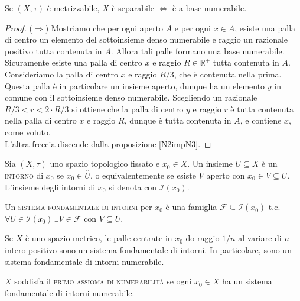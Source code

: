 \documentclass{article}
\begin{document}
\begin{prop} \label{metr-num}
	Se $(X, \tau)$ è metrizzabile, $X$ è separabile $\Leftrightarrow$ è a base numerabile.
\end{prop}

\begin{proof}
	($\Rightarrow$) Mostriamo che per ogni aperto $A$ e per ogni $x \in A$, esiste una palla di centro un elemento del sottoinsieme denso numerabile e raggio un razionale positivo tutta contenuta in $A$. Allora tali palle formano una base numerabile. \\
	Sicuramente esiste una palla di centro $x$ e raggio $R \in \mathbb{R}^+$ tutta contenuta in $A$. Consideriamo la palla di centro $x$ e raggio $R/3$, che è contenuta nella prima. Questa palla è in particolare un insieme aperto, dunque ha un elemento $y$ in comune con il sottoinsieme denso numerabile. Scegliendo un razionale $R/3<r<2 \cdot R/3$ si ottiene che la palla di centro $y$ e raggio $r$ è tutta contenuta nella palla di centro $x$ e raggio $R$, dunque è tutta contenuta in $A$, e contiene $x$, come voluto. \\
	L'altra freccia discende dalla proposizione \ref{N2impN3}.
\end{proof}

\begin{defn}
	Sia $(X, \tau)$ uno spazio topologico fissato e $x_0 \in X$. Un insieme $U \subseteq X$ è un \textsc{intorno} di $x_0$ se $x_0 \in \stackrel{\circ}{U}$, o equivalentemente se esiste $V$ aperto con $x_0 \in V \subseteq U$. L'insieme degli intorni di $x_0$ si denota con $\mathcal{I}(x_0)$.
\end{defn}

\begin{defn}
	Un \textsc{sistema fondamentale di intorni} per $x_0$ è una famiglia $\mathcal{F} \subseteq \mathcal{I}(x_0)$ t.c. $\forall U \in \mathcal{I(x_0)} \, \exists V \in \mathcal{F}$ con $V \subseteq U$.
\end{defn}

\begin{ex} \label{1/n}
	Se $X$ è uno spazio metrico, le palle centrate in $x_0$ do raggio $1/n$ al variare di $n$ intero positivo sono un sistema fondamentale di intorni. In particolare, sono un sistema fondamentale di intorni numerabile.
\end{ex}

\begin{defn} \label{N1}
	$X$ soddisfa il \textsc{primo assioma di numerabilità} se ogni $x_0 \in X$ ha un sistema fondamentale di intorni numerabile.
\end{defn}
\end{document}
